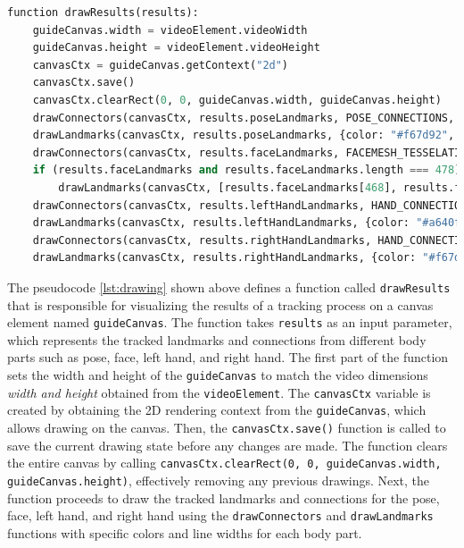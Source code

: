 \begin{lstlisting}[language=Python,caption=Setting the landmarks on the camera feed,label=lst:drawing]
  function drawResults(results):
    guideCanvas.width = videoElement.videoWidth
    guideCanvas.height = videoElement.videoHeight
    canvasCtx = guideCanvas.getContext("2d")
    canvasCtx.save()
    canvasCtx.clearRect(0, 0, guideCanvas.width, guideCanvas.height)
    drawConnectors(canvasCtx, results.poseLandmarks, POSE_CONNECTIONS, {color: "#a640ff", lineWidth: 4})
    drawLandmarks(canvasCtx, results.poseLandmarks, {color: "#f67d92", lineWidth: 2})
    drawConnectors(canvasCtx, results.faceLandmarks, FACEMESH_TESSELATION, {color: "#fcd4db", lineWidth: 1})
    if (results.faceLandmarks and results.faceLandmarks.length === 478):
        drawLandmarks(canvasCtx, [results.faceLandmarks[468], results.faceLandmarks[468 + 5]], {color: "#fcd4db", lineWidth: 2})
    drawConnectors(canvasCtx, results.leftHandLandmarks, HAND_CONNECTIONS, {color: "#FF1493", lineWidth: 5})
    drawLandmarks(canvasCtx, results.leftHandLandmarks, {color: "#a640ff", lineWidth: 2})
    drawConnectors(canvasCtx, results.rightHandLandmarks, HAND_CONNECTIONS, {color: "#a640ff", lineWidth: 5})
    drawLandmarks(canvasCtx, results.rightHandLandmarks, {color: "#f67d92", lineWidth: 2})
\end{lstlisting}

The pseudocode \ref{lst:drawing} shown above defines a function called \texttt{drawResults} that is responsible for visualizing the results of a tracking process on a canvas element 
named \texttt{guideCanvas}. The function takes \texttt{results} as an input parameter, which represents the tracked landmarks and connections from different body parts such as 
pose, face, left hand, and right hand. The first part of the function sets the width and height of the \texttt{guideCanvas} to 
match the video dimensions \emph{width and height} obtained from the \texttt{videoElement}.
The \texttt{canvasCtx} variable is created by obtaining the 2D rendering context from the \texttt{guideCanvas}, which allows drawing on the canvas.
Then, the \texttt{canvasCtx.save()} function is called to save the current drawing state before any changes are made.
The function clears the entire canvas by calling \texttt{canvasCtx.clearRect(0, 0, guideCanvas.width, guideCanvas.height)}, effectively removing any previous drawings.
Next, the function proceeds to draw the tracked landmarks and connections for the pose, face, left hand, and right hand using the \texttt{drawConnectors} 
and \texttt{drawLandmarks} functions with specific colors and line widths for each body part.

